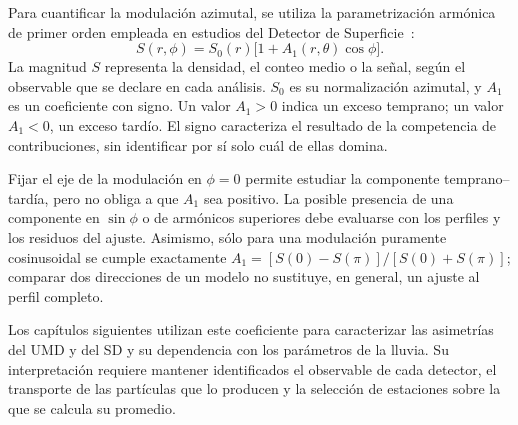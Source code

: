 Para cuantificar la modulación azimutal, se utiliza la parametrización armónica de primer orden empleada en estudios del Detector de Superficie~\cite{Billoir2002,BradfieldThesis}:
\begin{equation}
S(r,\phi)=S_0(r)\bigl[1+A_1(r,\theta)\cos\phi\bigr].
\label{eq:asimetria_a1}
\end{equation}
La magnitud $S$ representa la densidad, el conteo medio o la señal, según el observable que se declare en cada análisis. $S_0$ es su normalización azimutal, y $A_1$ es un coeficiente con signo. Un valor $A_1>0$ indica un exceso temprano; un valor $A_1<0$, un exceso tardío. El signo caracteriza el resultado de la competencia de contribuciones, sin identificar por sí solo cuál de ellas domina.

Fijar el eje de la modulación en $\phi=0$ permite estudiar la componente temprano--tardía, pero no obliga a que $A_1$ sea positivo. La posible presencia de una componente en $\sin\phi$ o de armónicos superiores debe evaluarse con los perfiles y los residuos del ajuste. Asimismo, sólo para una modulación puramente cosinusoidal se cumple exactamente $A_1=[S(0)-S(\pi)]/[S(0)+S(\pi)]$; comparar dos direcciones de un modelo no sustituye, en general, un ajuste al perfil completo.

Los capítulos siguientes utilizan este coeficiente para caracterizar las asimetrías del UMD y del SD y su dependencia con los parámetros de la lluvia. Su interpretación requiere mantener identificados el observable de cada detector, el transporte de las partículas que lo producen y la selección de estaciones sobre la que se calcula su promedio.

